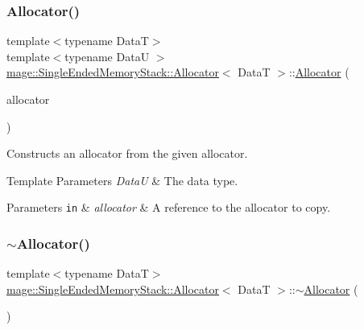 \subsubsection{\texorpdfstring{Allocator()}{Allocator()}\hspace{0.1cm}{\footnotesize\ttfamily [3/4]}}
{\footnotesize\ttfamily template$<$typename DataT$>$ \\
template$<$typename DataU $>$ \\
\hyperlink{structmage_1_1_single_ended_memory_stack_1_1_allocator}{mage\+::\+Single\+Ended\+Memory\+Stack\+::\+Allocator}$<$ DataT $>$\+::\hyperlink{structmage_1_1_single_ended_memory_stack_1_1_allocator}{Allocator} (\begin{DoxyParamCaption}\item[{const \hyperlink{structmage_1_1_single_ended_memory_stack_1_1_allocator}{Allocator}$<$ DataU $>$ \&}]{allocator }\end{DoxyParamCaption})\hspace{0.3cm}{\ttfamily [noexcept]}}

Constructs an allocator from the given allocator.


\begin{DoxyTemplParams}{Template Parameters}
{\em DataU} & The data type. \\
\hline
\end{DoxyTemplParams}

\begin{DoxyParams}[1]{Parameters}
\mbox{\tt in}  & {\em allocator} & A reference to the allocator to copy. \\
\hline
\end{DoxyParams}
\hypertarget{structmage_1_1_single_ended_memory_stack_1_1_allocator_a5b9721b0fb81964988f9f121d6372970}{}\label{structmage_1_1_single_ended_memory_stack_1_1_allocator_a5b9721b0fb81964988f9f121d6372970} 
\subsubsection{\texorpdfstring{$\sim$\+Allocator()}{~Allocator()}}
{\footnotesize\ttfamily template$<$typename DataT$>$ \\
\hyperlink{structmage_1_1_single_ended_memory_stack_1_1_allocator}{mage\+::\+Single\+Ended\+Memory\+Stack\+::\+Allocator}$<$ DataT $>$\+::$\sim$\hyperlink{structmage_1_1_single_ended_memory_stack_1_1_allocator}{Allocator} (\begin{DoxyParamCaption}{ }\end{DoxyParamCaption})\hspace{0.3cm}{\ttfamily [default]}}

